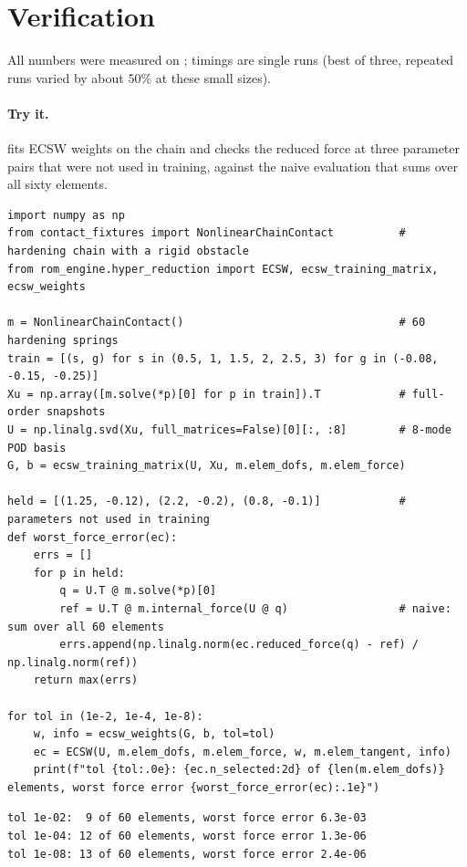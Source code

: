 \section{Verification}\label{sec:hy-verif}

All numbers were measured on \machine{}; timings are single runs (best of three, repeated runs varied by about $50\%$ at these small sizes).

\paragraph{Try it.}  fits ECSW weights on the chain and checks the reduced force at three parameter pairs that were not used in training, against the naive evaluation that sums over all sixty elements.

\begin{lstlisting}[caption={ECSW on the hardening chain: how many elements are needed, and the error against the full sum (run from \texttt{rom\_engine/tests} with both packages on the path).},label={lst:hy-try}]
import numpy as np
from contact_fixtures import NonlinearChainContact          # hardening chain with a rigid obstacle
from rom_engine.hyper_reduction import ECSW, ecsw_training_matrix, ecsw_weights

m = NonlinearChainContact()                                 # 60 hardening springs
train = [(s, g) for s in (0.5, 1, 1.5, 2, 2.5, 3) for g in (-0.08, -0.15, -0.25)]
Xu = np.array([m.solve(*p)[0] for p in train]).T            # full-order snapshots
U = np.linalg.svd(Xu, full_matrices=False)[0][:, :8]        # 8-mode POD basis
G, b = ecsw_training_matrix(U, Xu, m.elem_dofs, m.elem_force)

held = [(1.25, -0.12), (2.2, -0.2), (0.8, -0.1)]            # parameters not used in training
def worst_force_error(ec):
    errs = []
    for p in held:
        q = U.T @ m.solve(*p)[0]
        ref = U.T @ m.internal_force(U @ q)                 # naive: sum over all 60 elements
        errs.append(np.linalg.norm(ec.reduced_force(q) - ref) / np.linalg.norm(ref))
    return max(errs)

for tol in (1e-2, 1e-4, 1e-8):
    w, info = ecsw_weights(G, b, tol=tol)
    ec = ECSW(U, m.elem_dofs, m.elem_force, w, m.elem_tangent, info)
    print(f"tol {tol:.0e}: {ec.n_selected:2d} of {len(m.elem_dofs)} elements, worst force error {worst_force_error(ec):.1e}")
\end{lstlisting}

\begin{lstlisting}[numbers=none,language={},keywordstyle={},commentstyle={},frame=single,aboveskip=2pt]
tol 1e-02:  9 of 60 elements, worst force error 6.3e-03
tol 1e-04: 12 of 60 elements, worst force error 1.3e-06
tol 1e-08: 13 of 60 elements, worst force error 2.4e-06
\end{lstlisting}

